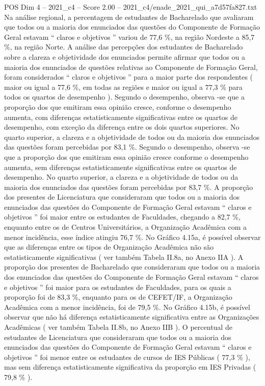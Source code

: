\begin{textsample}{POS Dim 4 – 2021\_c4 – Score 2.00 – 2021\_c4/enade\_2021\_qui\_a7d57fa827.txt}
Na análise regional, a percentagem de estudantes de Bacharelado que avaliaram que todos ou a maioria dos enunciados das questões do Componente de Formação Geral estavam “ claros e objetivos ” variou de 77,6 \%, na região Nordeste a 85,7 \%, na região Norte.
A análise das percepções dos estudantes de Bacharelado sobre a clareza e objetividade dos enunciados permite afirmar que todos ou a maioria dos enunciados de questões relativas ao Componente de Formação Geral, foram considerados “ claros e objetivos ” para a maior parte dos respondentes ( maior ou igual a 77,6 \%, em todas as regiões e maior ou igual a 77,3 \% para todos os quartos de desempenho ).
Segundo o desempenho, observa -se que a proporção dos que emitiram essa opinião cresce, conforme o desempenho aumenta, com diferenças estatisticamente significativas entre os quartos de desempenho, com exceção da diferença entre os dois quartos superiores.
No quarto superior, a clareza e a objetividade de todos ou da maioria dos enunciados das questões foram percebidas por 83,1 \%.
Segundo o desempenho, observa -se que a proporção dos que emitiram essa opinião cresce conforme o desempenho aumenta, sem diferenças estatisticamente significativas entre os quartos de desempenho.
No quarto superior, a clareza e a objetividade de todos ou da maioria dos enunciados das questões foram percebidas por 83,7 \%.
A proporção dos presentes de Licenciatura que consideraram que todos ou a maioria dos enunciados das questões do Componente de Formação Geral estavam “ claros e objetivos ” foi maior entre os estudantes de Faculdades, chegando a 82,7 \%, enquanto entre os de Centros Universitários, a Organização Acadêmica com a menor incidência, esse índice atingiu 76,7 \%.
No Gráfico 4.15a, é possível observar que as diferenças entre os tipos de Organização Acadêmica não são estatisticamente significativas ( ver também Tabela II.8a, no Anexo IIA ).
A proporção dos presentes de Bacharelado que consideraram que todos ou a maioria dos enunciados das questões do Componente de Formação Geral estavam “ claros e objetivos ” foi maior para os estudantes de Faculdades, para os quais a proporção foi de 83,3 \%, enquanto para os de CEFET/IF, a Organização Acadêmica com a menor incidência, foi de 79,5 \%.
No Gráfico 4.15b, é possível observar que não há diferença estatisticamente significativa entre as Organizações Acadêmicas ( ver também Tabela II.8b, no Anexo IIB ).
O percentual de estudantes de Licenciatura que consideraram que todos ou a maioria dos enunciados das questões do Componente de Formação Geral estavam “ claros e objetivos ” foi menor entre os estudantes de cursos de IES Públicas ( 77,3 \% ), mas sem diferença estatisticamente significativa da proporção em IES Privadas ( 79,8 \% ).

\end{textsample}
